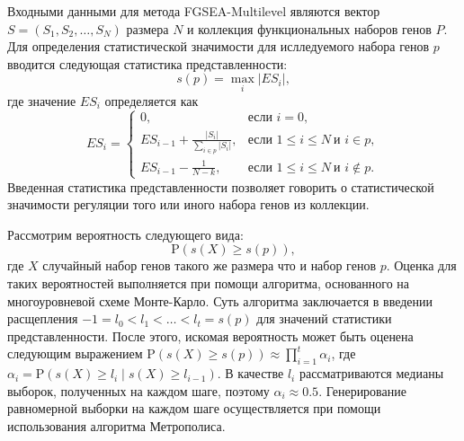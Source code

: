 Входными данными для метода FGSEA-Multilevel являются вектор $S = \left(S_1, S_2, \ldots, S_N\right)$ размера $N$ и коллекция функциональных наборов генов $P$.
Для определения статистической значимости для ислледуемого набора генов $p$ вводится следующая статистика представленности:
\[
    s(p) = \max_i \vert ES_i \vert,
\]
где значение $ES_i$ определяется как
\[
    ES_i = 
    \begin{cases}
        0, & \text{если } i = 0, \\
        ES_{i - 1} + \frac{\vert S_i \vert}{\sum\limits_{i \in p} \vert S_i \vert}, & \text{если } 1 \leqslant i \leqslant N \ \text{и } i \in p, \\
        ES_{i - 1} - \frac{1}{N - k}, & \text{если } 1 \leqslant i \leqslant N \ \text{и } i \not\in p.
    \end{cases}    
\]
Введенная статистика представленности позволяет говорить о статистической значимости регуляции того или иного набора генов из коллекции.

Рассмотрим вероятность следующего вида:
\[
    \mathrm{P} \left(s(X) \geqslant s(p) \right),
\]
где $X$ случайный набор генов такого же размера что и набор генов $p$. 
Оценка для таких вероятностей выполняется при помощи алгоритма, основанного на многоуровневой схеме Монте-Карло.
Суть алгоритма заключается в введении расщепления $-1 = l_0 < l_1 < \ldots < l_t = s(p)$ для значений статистики представленности.
После этого, искомая вероятность может быть оценена следующим выражением $\mathrm{P} \left(s(X) \geqslant s(p) \right) \approx \prod\limits_{i = 1}^{t} \alpha_i$, где $\alpha_i = \mathrm{P} \left(s(X) \geqslant l_i \mid s(X) \geqslant l_{i - 1} \right)$.
В качестве $l_i$ рассматриваются медианы выборок, полученных на каждом шаге, поэтому $\alpha_i \approx 0.5$.
Генерирование равномерной выборки на каждом шаге осуществляется при помощи использования алгоритма Метрополиса. 

